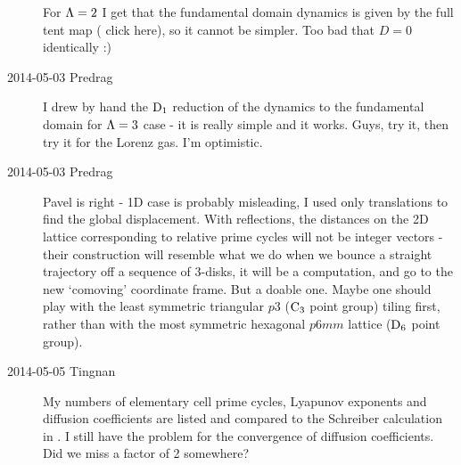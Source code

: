 \begin{description}
For $\Lambda =2$ I get that the fundamental domain dynamics is given by
the full tent map
( {click
here}), so it cannot be simpler. Too bad that $D=0$ identically :)

\item[2014-05-03 Predrag] I drew by hand the $\textrm{D}_{1}$ reduction of the
dynamics to the fundamental domain for $\Lambda =3$ case - it is really
simple and it works. Guys, try it, then try it for the Lorenz gas. I'm
optimistic.

\item[2014-05-03 Predrag] Pavel is right - 1D case is probably
misleading, I used only translations to find the global displacement.
With reflections, the distances on the 2D lattice corresponding to
relative prime cycles will not be integer vectors - their construction
will resemble what we do when we bounce a straight trajectory off a
sequence of 3-disks, it will be a computation, and go to the new
`comoving' coordinate frame. But a doable one. Maybe one should play with
the least symmetric triangular $p3$ ($\textrm{C}_{3}$ point group) tiling first,
rather than with the most symmetric hexagonal $p6mm$ lattice ($\textrm{D}_{6}$
point group).

\item[2014-05-05 Tingnan] My numbers of elementary cell prime cycles,
Lyapunov exponents and diffusion coefficients are listed and compared
to the Schreiber calculation in . I still have the problem
for the convergence of diffusion coefficients. Did we miss a factor of 2
somewhere?


\end{description}
